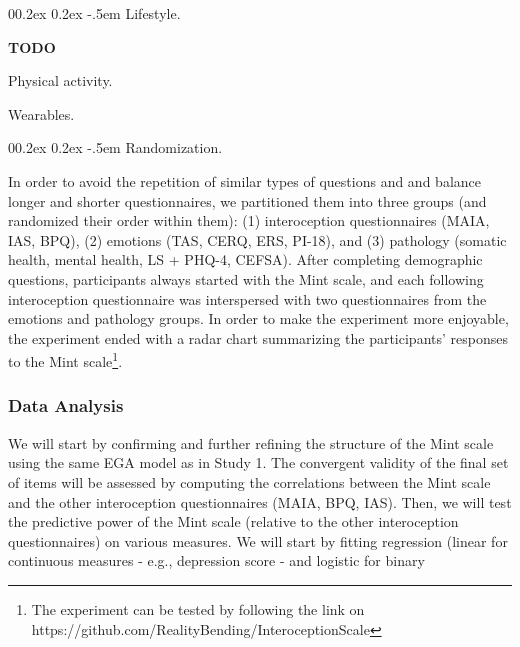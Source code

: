 \documentclass[
  jou,
  floatsintext,
  longtable,
  nolmodern,
  notxfonts,
  notimes,
  colorlinks=true,linkcolor=blue,citecolor=blue,urlcolor=blue]{apa7}
\makeatletter
\renewcommand{\paragraph}{\@startsection{paragraph}{4}{\parindent}%
	{0\baselineskip \@plus 0.2ex \@minus 0.2ex}%
	{-.5em}%
	{\normalfont\normalsize\bfseries\typesectitle}}
\makeatother
\begin{document}
\paragraph{Lifestyle.}\label{lifestyle}

\textbf{TODO}

Physical activity.

Wearables.

\paragraph{Randomization.}\label{randomization}

In order to avoid the repetition of similar types of questions and and
balance longer and shorter questionnaires, we partitioned them into
three groups (and randomized their order within them): (1) interoception
questionnaires (MAIA, IAS, BPQ), (2) emotions (TAS, CERQ, ERS, PI-18),
and (3) pathology (somatic health, mental health, LS + PHQ-4, CEFSA).
After completing demographic questions, participants always started with
the Mint scale, and each following interoception questionnaire was
interspersed with two questionnaires from the emotions and pathology
groups. In order to make the experiment more enjoyable, the experiment
ended with a radar chart summarizing the participants' responses to the
Mint scale\footnote{The experiment can be tested by following the link
  on https://github.com/RealityBending/InteroceptionScale}.

\subsubsection{Data Analysis}\label{data-analysis-1}

We will start by confirming and further refining the structure of the
Mint scale using the same EGA model as in Study 1. The convergent
validity of the final set of items will be assessed by computing the
correlations between the Mint scale and the other interoception
questionnaires (MAIA, BPQ, IAS). Then, we will test the predictive power
of the Mint scale (relative to the other interoception questionnaires)
on various measures. We will start by fitting regression (linear for
continuous measures - e.g., depression score - and logistic for binary
\end{document}
